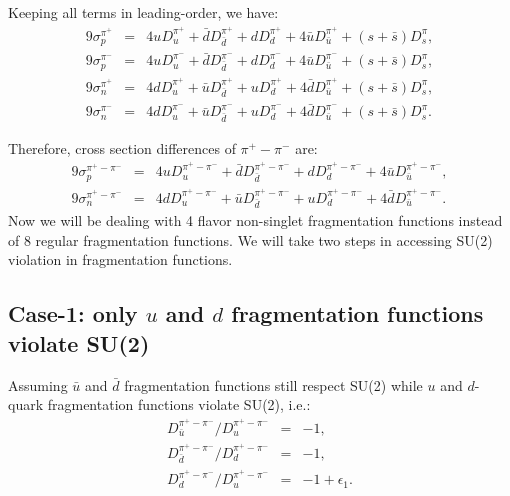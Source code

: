 Keeping all terms in leading-order, we have:
\begin{eqnarray}  
 9 \sigma_p^{\pi^+} & = & 4 u D_u^{{\pi}^+} + \bar{d} D_{\bar{d}}^{\pi^+} 
   + d D_d^{\pi^+}+ 4 {\bar u} D_{\bar u}^{\pi^+} + (s+\bar{s}) D_s^{\pi}, \nonumber \\ 
 9 \sigma_p^{\pi^-} & = & 4 u D_u^{{\pi}^-} + \bar{d} D_{\bar{d}}^{\pi^-} 
   + d D_d^{\pi^-}+ 4 {\bar u} D_{\bar u}^{\pi^-} + (s+\bar{s}) D_s^{\pi}, \nonumber \\ 
 9 \sigma_n^{\pi^+} & = & 4 d D_u^{{\pi}^+} + \bar{u} D_{\bar{d}}^{\pi^+} 
   + u D_d^{\pi^+}+ 4 {\bar d} D_{\bar u}^{\pi^+} + (s+\bar{s}) D_s^{\pi}, \nonumber \\ 
 9 \sigma_n^{\pi^-} & = & 4 d D_u^{{\pi}^-} + \bar{u} D_{\bar{d}}^{\pi^-} 
   + u D_d^{\pi^-}+ 4 {\bar d} D_{\bar u}^{\pi^-} + (s+\bar{s}) D_s^{\pi}.
\label{eq:nucleon2}  
\end{eqnarray}  

Therefore, cross section differences of $\pi^+ - \pi^-$ are:
\begin{eqnarray}  
 9 \sigma_p^{\pi^+ -\pi^-} & = & 4 u D_u^{\pi^+ -\pi^-} + \bar{d} D_{\bar{d}}^{\pi^+ -\pi^-} 
   + d D_d^{\pi^+ -\pi^-}+ 4 {\bar u} D_{\bar u}^{\pi^+ -\pi^-}, \nonumber \\ 
 9 \sigma_n^{\pi^+ -\pi^-} & = & 4 d D_u^{\pi^+ -\pi^-} + \bar{u} D_{\bar{d}}^{\pi^+ -\pi^-} 
   + u D_d^{\pi^+ -\pi^-}+ 4 {\bar d} D_{\bar u}^{\pi^+ -\pi^-}. 
\label{eq:nucleon3}  
\end{eqnarray}  
Now we will be dealing with 4 flavor non-singlet fragmentation functions instead of 8 regular fragmentation functions. 
We will take two steps in accessing SU(2) violation in fragmentation functions.

\subsection{Case-1: only $u$ and $d$  fragmentation  functions violate SU(2)}
Assuming $\bar{u}$ and $\bar{d}$ fragmentation functions 
still respect SU(2) while $u$ and $d$-quark fragmentation functions violate 
SU(2), i.e.:
\begin{eqnarray}  
 D_{\bar u}^{\pi^+ -\pi^-}/D_u^{\pi^+ -\pi^-} & = & -1, \nonumber \\ 
 D_{\bar d}^{\pi^+ -\pi^-}/D_d^{\pi^+ -\pi^-} & = & -1, \nonumber \\ 
 D_{d}^{\pi^+ -\pi^-}/D_u^{\pi^+ -\pi^-} & = & -1+\epsilon_1.
\label{eq:nucleon4}  
\end{eqnarray}  

